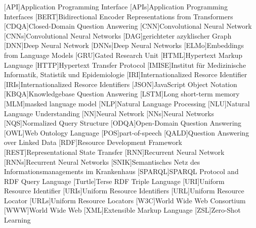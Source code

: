\begin{acronym}
[API]{Application Programming Interface}
[APIs]{Application Programming Interfaces}
[BERT]{Bidirectional Encoder Representations from Transformers}
[CDQA]{Closed-Domain Question Answering}
[CNN]{Convolutional Neural Network}
[CNNs]{Convolutional Neural Networks}
[DAG]{gerichteter azyklischer Graph}
[DNN]{Deep Neural Network}
[DNNs]{Deep Neural Networks}
[ELMo]{Embeddings from Language Models}
[GRU]{Gated Research Unit}
[HTML]{Hypertext Markup Language}
[HTTP]{Hypertext Transfer Protocol}
[IMISE]{Institut für Medizinische Informatik, Statistik und Epidemiologie}
[IRI]{Internationalized Resorce Identifier}
[IRIs]{Internationalized Resorce Identifiers}
[JSON]{JavaScript Object Notation}
[KBQA]{Knowledgebase Question Answering}
[LSTM]{Long short-term memory}
[MLM]{masked language model}
[NLP]{Natural Language Processing}
[NLU]{Natural Language Understanding}
[NN]{Neural Network}
[NNs]{Neural Networks}
[NQS]{Normalized Query Structure}
[ODQA]{Open-Domain Question Answering}
[OWL]{Web Ontology Language}
[POS]{part-of-speech}
[QALD]{Question Answering over Linked Data}
[RDF]{Resource Development Framework}
[REST]{Representational State Transfer}
[RNN]{Recurrent Neural Network}
[RNNs]{Recurrent Neural Networks}
[SNIK]{Semantisches Netz des Informationsmanagements im Krankenhaus}
[SPARQL]{SPARQL Protocol and RDF Query Language}
[Turtle]{Terse RDF Triple Language}
[URI]{Uniform Resource Identifier}
[URIs]{Uniform Resource Identifiers}
[URL]{Uniform Resource Locator}
[URLs]{Uniform Resource Locators}
[W3C]{World Wide Web Consortium}
[WWW]{World Wide Web}
[XML]{Extensible Markup Language}
[ZSL]{Zero-Shot Learning}
\end{acronym}
